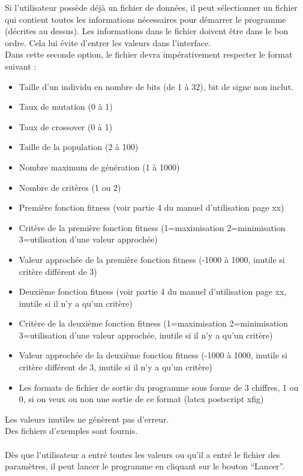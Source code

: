\documentclass[a4paper,11pt]{article}
\begin{document}
			Si l’utilisateur possède déjà un fichier de données, il peut  sélectionner un fichier qui contient toutes les informations nécessaires pour démarrer le programme (décrites au dessus).
			Les informations dans le fichier doivent être dans le bon ordre.
			Cela lui évite d’entrer les valeurs dans l’interface.\\
			Dans cette seconde option, le fichier devra impérativement respecter le format suivant :
				\begin{itemize}
					\item Taille d'un individu en nombre de bits (de 1 à 32), bit de signe non inclut.
					\item Taux de mutation (0 à 1)
					\item Taux de crossover (0 à 1)
					\item Taille de la population (2 à 100)
					\item Nombre maximum de génération (1 à 1000)
					\item Nombre de critères (1 ou 2)
					\item Première fonction fitness (voir partie 4 du manuel d'utilisation page xx)
					\item Critère de la première fonction fitness (1=maximisation 2=minimisation 3=utilisation d'une valeur approchée)
					\item Valeur approchée de la première fonction fitness (-1000 à 1000, inutile si critère différent de 3)
					\item Deuxième fonction fitness (voir partie 4 du manuel d'utilisation page xx, inutile si il n'y a qu'un critère)
					\item Critère de la deuxième fonction fitness (1=maximisation 2=minimisation 3=utilisation d'une valeur approchée, inutile si il n'y a qu'un critère)
					\item Valeur approchée de la deuxième fonction fitness (-1000 à 1000, inutile si critère différent de 3, inutile si il n'y a qu'un critère)
					\item Les formats de fichier de sortie du programme sous forme de 3 chiffres, 1 ou 0, si on veux ou non une sortie de ce format (latex postscript xfig)
				\end{itemize}
			Les valeurs inutiles ne génèrent pas d'erreur.\\
			Des fichiers d'exemples sont fournis.\\\\
			Dès que l’utilisateur a entré toutes les valeurs ou qu’il a entré le fichier des paramètres, il peut lancer le programme en cliquant sur le bouton “Lancer”.\\
\end{document}
